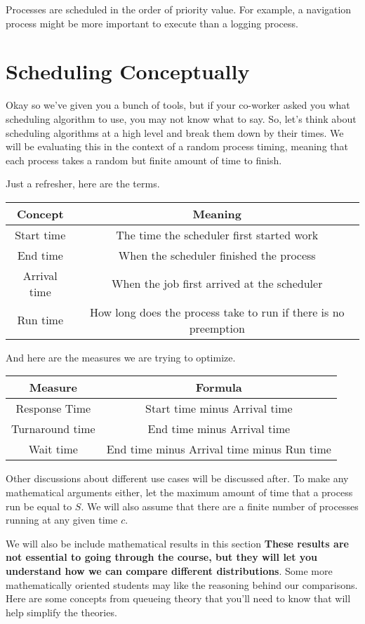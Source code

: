 Processes are scheduled in the order of priority value.
For example, a navigation process might be more important to execute than a logging process.

\section{Scheduling Conceptually}

Okay so we've given you a bunch of tools, but if your co-worker asked you what scheduling algorithm to use, you may not know what to say.
So, let's think about scheduling algorithms at a high level and break them down by their times.
We will be evaluating this in the context of a random process timing, meaning that each process takes a random but finite amount of time to finish.

Just a refresher, here are the terms.

\begin{tabular}{|c|c|}
  Concept & Meaning \\ \hline
  Start time & The time the scheduler first started work \\
  End time & When the scheduler finished the process \\
  Arrival time & When the job first arrived at the scheduler \\
  Run time & How long does the process take to run if there is no preemption
\end{tabular}

And here are the measures we are trying to optimize.

\begin{tabular}{|c|c|}
  Measure & Formula \\ \hline
  Response Time & Start time minus Arrival time\\
  Turnaround time & End time minus Arrival time\\
  Wait time & End time minus Arrival time minus Run time \\
\end{tabular}

Other discussions about different use cases will be discussed after.
To make any mathematical arguments either, let the maximum amount of time that a process run be equal to $S$.
We will also assume that there are a finite number of processes running at any given time $c$.

We will also be include mathematical results in this section \textbf{These results are not essential to going through the course, but they will let you understand how we can compare different distributions}.
Some more mathematically oriented students may like the reasoning behind our comparisons.
Here are some concepts from queueing theory that you'll need to know that will help simplify the theories.

